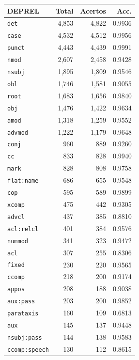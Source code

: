 \begin{table}[ht]
\centering
\footnotesize
\begin{tabular}{lrrr}
\toprule
\textbf{DEPREL} & \textbf{Total} & \textbf{Acertos} & \textbf{Acc.} \\
\midrule
\texttt{det} & 4,853 & 4,822 & 0.9936 \\
\texttt{case} & 4,532 & 4,512 & 0.9956 \\
\texttt{punct} & 4,443 & 4,439 & 0.9991 \\
\texttt{nmod} & 2,607 & 2,458 & 0.9428 \\
\texttt{nsubj} & 1,895 & 1,809 & 0.9546 \\
\texttt{obl} & 1,746 & 1,581 & 0.9055 \\
\texttt{root} & 1,683 & 1,656 & 0.9840 \\
\texttt{obj} & 1,476 & 1,422 & 0.9634 \\
\texttt{amod} & 1,318 & 1,259 & 0.9552 \\
\texttt{advmod} & 1,222 & 1,179 & 0.9648 \\
\texttt{conj} & 960 & 889 & 0.9260 \\
\texttt{cc} & 833 & 828 & 0.9940 \\
\texttt{mark} & 828 & 808 & 0.9758 \\
\texttt{flat\!:\!name} & 686 & 655 & 0.9548 \\
\texttt{cop} & 595 & 589 & 0.9899 \\
\texttt{xcomp} & 475 & 442 & 0.9305 \\
\texttt{advcl} & 437 & 385 & 0.8810 \\
\texttt{acl\!:\!relcl} & 401 & 384 & 0.9576 \\
\texttt{nummod} & 341 & 323 & 0.9472 \\
\texttt{acl} & 307 & 255 & 0.8306 \\
\texttt{fixed} & 230 & 220 & 0.9565 \\
\texttt{ccomp} & 218 & 200 & 0.9174 \\
\texttt{appos} & 208 & 188 & 0.9038 \\
\texttt{aux\!:\!pass} & 203 & 200 & 0.9852 \\
\texttt{parataxis} & 160 & 109 & 0.6813 \\
\texttt{aux} & 145 & 137 & 0.9448 \\
\texttt{nsubj\!:\!pass} & 144 & 138 & 0.9583 \\
\texttt{ccomp\!:\!speech} & 130 & 112 & 0.8615 \\

\end{tabular}
\end{table}
